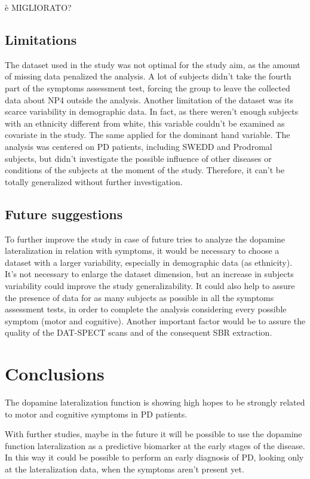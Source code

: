 \documentclass[]{article}
\begin{document}
\begin{multicols}{2}
è MIGLIORATO?

 

\subsection{Limitations}

The dataset used in the study was not optimal for the study aim, as the amount of missing data penalized the analysis. A lot of subjects didn't take the fourth part of the symptoms assessment test, forcing the group to leave the collected data about NP4 outside the analysis. 
Another limitation of the dataset was its scarce variability in demographic data. In fact, as there weren't enough subjects with an ethnicity different from white, this variable couldn't be examined as covariate in the study. The same applied for the dominant hand variable. 
The analysis was centered on PD patients, including SWEDD and Prodromal subjects, but didn't investigate the possible influence of other diseases or conditions of the subjects at the moment of the study. Therefore, it can't be totally generalized without further investigation. 

\subsection{Future suggestions}

To further improve the study in case of future tries to analyze the dopamine lateralization in relation with symptoms, it would be necessary to choose a dataset with a larger variability, especially in demographic data (as ethnicity). It's not necessary to enlarge the dataset dimension, but an increase in subjects variability could improve the study generalizability.
It could also help to assure the presence of data for as many subjects as possible in all the symptoms assessment tests, in order to complete the analysis considering every possible symptom (motor and cognitive). 
Another important factor would be to assure the quality of the DAT-SPECT scans and of the consequent SBR extraction. 

\section{Conclusions}

The dopamine lateralization function is showing high hopes to be strongly related to motor and cognitive symptoms in PD patients. 

With further studies, maybe in the future it will be possible to use the dopamine function lateralization as a predictive biomarker at the early stages of the disease. In this way it could be possible to perform an early diagnosis of PD, looking only at the lateralization data, when the symptoms aren't present yet.


\end{multicols}

\printbibliography
\end{document}
